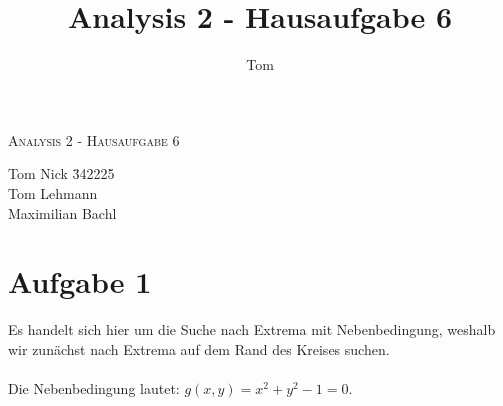\documentclass[10pt,a4paper,parskip=half]{scrartcl}
\author{Tom}
\title{Analysis 2 - Hausaufgabe 6}
\begin{document}
\begin{center}
\textsc{\Large{Analysis 2 - Hausaufgabe 6}} \\
\end{center}
\begin{tabbing}
Tom Nick \hspace{1.4cm}\= 342225\\
Tom Lehmann\\
Maximilian Bachl
\end{tabbing}
\section*{Aufgabe 1}
Es handelt sich hier um die Suche nach Extrema mit Nebenbedingung, weshalb wir zunächst nach Extrema auf dem Rand des Kreises suchen.\\\\
Die Nebenbedingung lautet: $g(x,y) = x^2 + y^2 - 1 = 0$.
\end{document}
